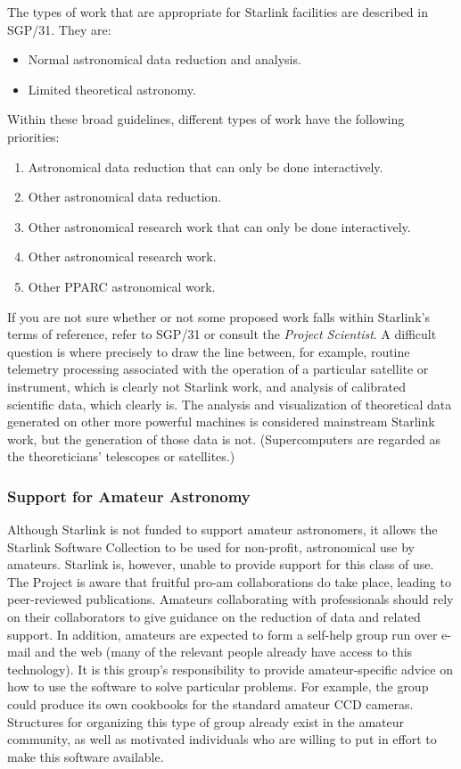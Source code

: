 \documentclass[twoside,11pt]{article}
\newcommand{\xref}[3]{#1}
\begin{document}
The types of work that are appropriate for Starlink facilities are described
in \xref{SGP/31}{sgp31}{}.
They are:

\begin{itemize}
\item Normal astronomical data reduction and analysis.
\item Limited theoretical astronomy.
\end{itemize}

Within these broad guidelines, different types of work have the following
priorities:

\begin{enumerate} 
\item Astronomical data reduction that can only be done interactively.  
\item Other astronomical data reduction.  
\item Other astronomical research work that can only be done interactively.
\item Other astronomical research work.  
\item Other PPARC astronomical work.
\end{enumerate} 

If you are not sure whether or not some proposed work falls within Starlink's
terms of reference, refer to
\xref{SGP/31}{sgp31}{}
or consult the {\em Project Scientist}.
A difficult question is where precisely to draw the line between, for
example, routine telemetry processing associated with the operation of
a particular satellite or instrument, which is clearly not Starlink
work, and analysis of calibrated scientific data, which clearly is.
The analysis and visualization of theoretical data generated on other more
powerful machines is considered mainstream Starlink work, but the generation of
those data is not.
(Supercomputers are regarded as the theoreticians' telescopes or satellites.)

\subsubsection{\label{amateurs}Support for Amateur Astronomy}

Although Starlink is not funded to support amateur astronomers, it allows the
Starlink Software Collection to be used for non-profit, astronomical use by
amateurs.
Starlink is, however, unable to provide support for this class of use.
The Project is aware that fruitful pro-am collaborations do take place,
leading to peer-reviewed publications.
Amateurs collaborating with professionals should rely on their collaborators
to give guidance on the reduction of data and related support.
In addition, amateurs are expected to form a self-help group run over e-mail
and the web (many of the relevant people already have access to this
technology).
It is this group's responsibility to provide amateur-specific advice on how to
use the software to solve particular problems.
For example, the group could produce its own cookbooks for the standard amateur
CCD cameras.
Structures for organizing this type of group already exist in the amateur
community, as well as motivated individuals who are willing to put in effort to
make this software available.
\end{document}
